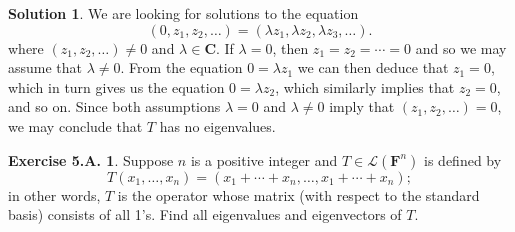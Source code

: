 \documentclass[12pt]{article}
\theoremstyle{definition}
\theoremstyle{exercise}
\newtheorem{exercise}{Exercise 5.A.}
\theoremstyle{solution}
\newtheorem*{solution}{Solution}
\newcommand{\lmap}{\mathcal{L}}
\newcommand{\C}{\mathbf{C}}
\newcommand{\F}{\mathbf{F}}
\begin{document}
\begin{solution}
    We are looking for solutions to the equation
    \[
        (0, z_1, z_2, \ldots) = (\lambda z_1, \lambda z_2, \lambda z_3, \ldots).
    \]
    where \( (z_1, z_2, \ldots) \neq 0 \) and \( \lambda \in \C \). If \( \lambda = 0 \), then \( z_1 = z_2 = \cdots = 0 \) and so we may assume that \( \lambda \neq 0 \). From the equation \( 0 = \lambda z_1 \) we can then deduce that \( z_1 = 0 \), which in turn gives us the equation \( 0 = \lambda z_2 \), which similarly implies that \( z_2 = 0 \), and so on. Since both assumptions \( \lambda = 0 \) and \( \lambda \neq 0 \) imply that \( (z_1, z_2, \ldots) = 0 \), we may conclude that \( T \) has no eigenvalues.
\end{solution}

\begin{exercise}
\label{ex:19}
    Suppose \( n \) is a positive integer and \( T \in \lmap(\F^n) \) is defined by
    \[
        T(x_1, \ldots, x_n) = (x_1 + \cdots + x_n, \ldots, x_1 + \cdots + x_n);
    \]
    in other words, \( T \) is the operator whose matrix (with respect to the standard basis) consists of all 1's. Find all eigenvalues and eigenvectors of \( T \).
\end{exercise}
\end{document}
